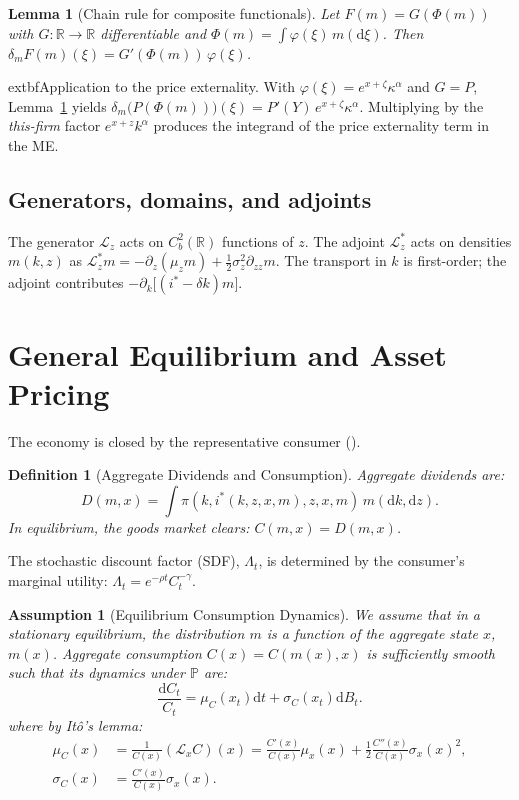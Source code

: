 \documentclass[11pt,letterpaper,oneside]{article}
\newtheorem{lemmaT}{Lemma}
\newtheorem{assumptionT}{Assumption}
\newtheorem{definitionT}{Definition}
\newenvironment{assumption}[2]{\begin{assumptionT}[#1]\label{ass:#2}}{\end{assumptionT}}
\newenvironment{definition}[2]{\begin{definitionT}[#1]\label{def:#2}}{\end{definitionT}}
\newenvironment{lemma}[2]{\begin{lemmaT}[#1]\label{lem:#2}}{\end{lemmaT}}
\newcommand{\R}{\mathbb{R}}
\newcommand{\diff}{\mathrm{d}}
\newcommand{\Lx}{\mathcal{L}_x}
\newcommand{\Lz}{\mathcal{L}_z}
\newcommand{\Lzadj}{\mathcal{L}_z^{*}}
\newcommand{\Dm}{\delta_m}
\begin{document}
\begin{lemma}{Chain rule for composite functionals}{chain}
Let $F(m)=G(\Phi(m))$ with $G:\R\to\R$ differentiable and $\Phi(m)=\int \varphi(\xi)\,m(\diff\xi)$. Then $\Dm F(m)(\xi)=G'(\Phi(m))\,\varphi(\xi)$.
\end{lemma}

\begin{tcolorbox}[mathstyle]
      extbf{Application to the price externality.} With $\varphi(\xi)=e^{x+\zeta}\kappa^\alpha$ and $G=P$, Lemma~\ref{lem:chain} yields
$\Dm\big(P(\Phi(m))\big)(\xi)=P'(Y)\,e^{x+\zeta}\kappa^\alpha$.
Multiplying by the \emph{this-firm} factor $e^{x+z}k^\alpha$ produces the integrand of the price externality term in the ME.
\end{tcolorbox}

\subsection{Generators, domains, and adjoints}
The generator $\Lz$ acts on $C_b^2(\R)$ functions of $z$. The adjoint $\Lzadj$ acts on densities $m(k,z)$ as $\Lzadj m = -\partial_z(\mu_z m) + \tfrac12 \sigma_z^2 \partial_{zz} m$. The transport in $k$ is first-order; the adjoint contributes $-\partial_k\big[(i^*-\delta k)m\big]$.

\section{General Equilibrium and Asset Pricing}\label{sec:pricing}

The economy is closed by the representative consumer ().

\begin{definition}{Aggregate Dividends and Consumption}{agg_cd}
Aggregate dividends are:
$$
D(m,x) = \int \pi(k,i^*(k,z,x,m),z,x,m)\, m(\diff k,\diff z).
$$
In equilibrium, the goods market clears: $C(m,x)=D(m,x)$.
\end{definition}

The stochastic discount factor (SDF), $\Lambda_t$, is determined by the consumer's marginal utility: $\Lambda_t = e^{-\rho t} C_t^{-\gamma}$.

\begin{assumption}{Equilibrium Consumption Dynamics}{ass:c_dynamics}
We assume that in a stationary equilibrium, the distribution $m$ is a function of the aggregate state $x$, $m(x)$. Aggregate consumption $C(x)=C(m(x),x)$ is sufficiently smooth such that its dynamics under $\mathbb{P}$ are:
$$
\frac{\diff C_t}{C_t} = \mu_C(x_t)\diff t + \sigma_C(x_t)\diff B_t.
$$
where by Itô's lemma:
\begin{align*}
    \mu_C(x) &= \frac{1}{C(x)} (\Lx C)(x) = \frac{C'(x)}{C(x)}\mu_x(x) + \frac{1}{2}\frac{C''(x)}{C(x)}\sigma_x(x)^2, \\
    \sigma_C(x) &= \frac{C'(x)}{C(x)}\sigma_x(x).
\end{align*}
\end{assumption}
\end{document}
